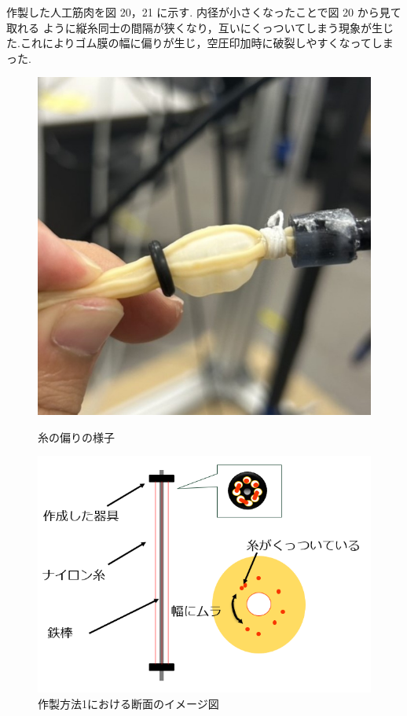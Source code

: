 作製した人工筋肉を図 20，21 に示す.
内径が小さくなったことで図 20 から見て取れる ように縦糸同士の間隔が狭くなり，互いにくっついてしまう現象が生じた.これによりゴム膜の幅に偏りが生じ，空圧印加時に破裂しやすくなってしまった.

\begin{figure}[htbp]
  \centering
  \begin{minipage}{0.49\hsize}
      \centering
      \includegraphics[scale=0.3]{pic/17.jpg}
      \caption{糸の偏りの様子}
      \label{fig:18}
  \end{minipage} \hfill
  \begin{minipage}{0.49\hsize}
      \centering
      \includegraphics[scale=0.4]{pic/18.PNG}
      \caption{作製方法1における断面のイメージ図}
      \label{fig:19}
  \end{minipage} 
\end{figure}

